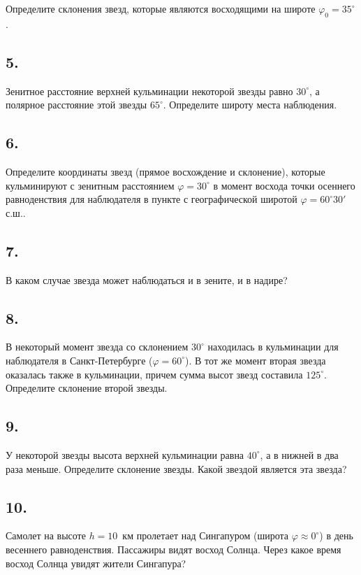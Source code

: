 \documentclass[a4paper,12pt]{article}
\begin{document}
Определите склонения звезд, которые являются восходящими на широте $\varphi_0 = 35^{\circ}$.

\subsection*{5. } Зенитное расстояние верхней кульминации некоторой звезды равно $30^{\circ}$, а полярное расстояние этой звезды $65^{\circ}$. Определите широту места наблюдения.

\subsection*{6. }

Определите координаты звезд (прямое восхождение и склонение), которые кульминируют с зенитным расстоянием $\varphi = 30^{\circ}$ в момент восхода точки осеннего равноденствия для наблюдателя в пункте с географической широтой $\varphi = 60^{\circ} 30'$ с.ш.. %


\subsection*{7. }

В каком случае звезда может наблюдаться и в зените, и в надире?

\subsection*{8. }

В некоторый момент звезда со склонением $30^{\circ}$ находилась в кульминации
для наблюдателя в Санкт-Петербурге ($\varphi = 60^{\circ}$). В тот же момент вторая звезда оказалась также в кульминации, причем сумма высот звезд составила $125^{\circ}$. Определите склонение второй звезды. %

\subsection*{9. }

У некоторой звезды высота верхней кульминации равна $40^{\circ}$, а в нижней в два раза меньше. Определите склонение звезды. Какой звездой является эта звезда?


\subsection*{10.}

Самолет на высоте $h=10$~км пролетает над Сингапуром (широта $\varphi \approx 0^{\circ}$) в день весеннего равноденствия. Пассажиры видят восход Солнца. Через какое время восход Солнца увидят жители Сингапура?
\end{document}
